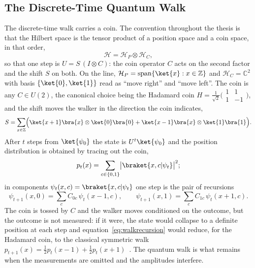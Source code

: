 \subsection{The Discrete-Time Quantum Walk}
\label{sec:prelim-dtqw}
The discrete-time walk carries a coin. The convention throughout the thesis
is that the Hilbert space is the tensor product of a position space and a
coin space, in that order,
\begin{equation}
	\mathcal{H} = \mathcal{H}_P \otimes \mathcal{H}_C ,
\end{equation}
so that one step is $U = S\,(I \otimes C)$: the coin operator $C$ acts on the
second factor and the shift $S$ on both. On the line, $\mathcal{H}_P =
\operatorname{span}\{\ket{x} : x \in \mathbb{Z}\}$ and $\mathcal{H}_C =
\mathbb{C}^2$ with basis $\{\ket{0}, \ket{1}\}$ read as ``move right'' and
``move left''. The coin is any $C \in U(2)$, the canonical choice being the
Hadamard coin $H = \tfrac{1}{\sqrt{2}}\bigl(\begin{smallmatrix} 1 & 1 \\ 1 &
-1 \end{smallmatrix}\bigr)$, and the shift moves the walker in the direction
the coin indicates,
\begin{equation}
	S = \sum_{x \in \mathbb{Z}} \Bigl( \ket{x+1}\bra{x} \otimes \ket{0}\bra{0} + \ket{x-1}\bra{x} \otimes \ket{1}\bra{1} \Bigr).
	\label{eq:shiftline}
\end{equation}
After $t$ steps from $\ket{\psi_0}$ the state is $U^t\ket{\psi_0}$ and the
position distribution is obtained by tracing out the coin,
\begin{equation}
	p_t(x) = \sum_{c \in \{0, 1\}} \bigl| \braket{x, c | \psi_t} \bigr|^2 ;
	\label{eq:walkprob}
\end{equation}
in components $\psi_t(x, c) = \braket{x, c|\psi_t}$ one step is the pair of
recursions
\begin{equation}
	\psi_{t+1}(x, 0) = \sum_{c} C_{0c}\, \psi_t(x-1, c), \qquad
	\psi_{t+1}(x, 1) = \sum_{c} C_{1c}\, \psi_t(x+1, c).
	\label{eq:walkrecursion}
\end{equation}
The coin is tossed by $C$ and the walker moves conditioned on the outcome,
but the outcome is not measured: if it were, the state would collapse to a
definite position at each step and equation~\eqref{eq:walkrecursion} would
reduce, for the Hadamard coin, to the classical symmetric walk $p_{t+1}(x) =
\tfrac12 p_t(x-1) + \tfrac12 p_t(x+1)$~\cite{Kempe_2003}. The quantum walk is
what remains when the measurements are omitted and the amplitudes interfere.
